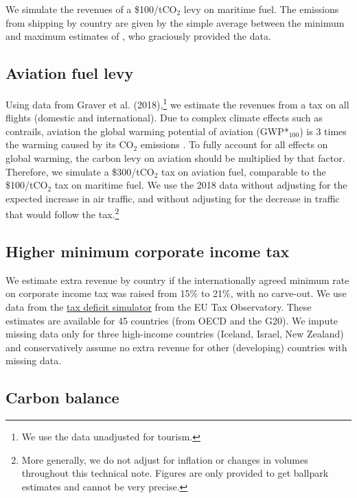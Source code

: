 \documentclass[12pt,english]{article}
\begin{document}
We simulate the revenues of a \$100/tCO$_\text{2}$ levy on maritime fuel. The emissions from shipping by country are given by the simple average between the minimum and maximum estimates of \citet{dequiedt_navigating_2024}, who graciously provided the data. 

\subsection{Aviation fuel levy}\label{sec:wealth}

Using data from Graver et al. (2018)\cite{graver_CO2_2018},\footnote{We use the data unadjusted for tourism.} we estimate the revenues from a tax on all flights (domestic and international). Due to complex climate effects such as contrails, aviation the global warming potential of aviation (GWP*$_\text{100}$) is 3 times the warming caused by its CO$_\text{2}$ emissions \citep{lee_contribution_2021}. To fully account for all effects on global warming, the carbon levy on aviation should be multiplied by that factor. Therefore, we simulate a \$300/tCO$_\text{2}$ tax on aviation fuel, comparable to the \$100/tCO$_\text{2}$ tax on maritime fuel. We use the 2018 data without adjusting for the expected increase in air traffic, and without adjusting for the decrease in traffic that would follow the tax.\footnote{More generally, we do not adjust for inflation or changes in volumes throughout this technical note. Figures are only provided to get ballpark estimates and cannot be very precise.}

\subsection{Higher minimum corporate income tax}

We estimate extra revenue by country if the internationally agreed minimum rate on corporate income tax was raised from 15\% to 21\%, with no carve-out. We use data from the \href{https://www.taxobservatory.eu/fr/base-de-donn%C3%A9es/the-tax-deficit-simulator/}{tax deficit simulator} from the EU Tax Observatory. These estimates are available for 45 countries (from OECD and the G20). We impute missing data only for three high-income countries (Iceland, Israel, New Zealand) and conservatively assume no extra revenue for other (developing) countries with missing data.

\subsection{Carbon balance}
\end{document}
